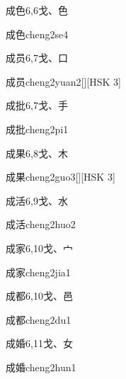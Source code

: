 \begin{entry}{成色}{6,6}{⼽、⾊}
  \begin{phonetics}{成色}{cheng2se4}
  \end{phonetics}
\end{entry}

\begin{entry}{成员}{6,7}{⼽、⼝}
  \begin{phonetics}{成员}{cheng2yuan2}[][HSK 3]
  \end{phonetics}
\end{entry}

\begin{entry}{成批}{6,7}{⼽、⼿}
  \begin{phonetics}{成批}{cheng2pi1}
  \end{phonetics}
\end{entry}

\begin{entry}{成果}{6,8}{⼽、⽊}
  \begin{phonetics}{成果}{cheng2guo3}[][HSK 3]
  \end{phonetics}
\end{entry}

\begin{entry}{成活}{6,9}{⼽、⽔}
  \begin{phonetics}{成活}{cheng2huo2}
  \end{phonetics}
\end{entry}

\begin{entry}{成家}{6,10}{⼽、⼧}
  \begin{phonetics}{成家}{cheng2jia1}
  \end{phonetics}
\end{entry}

\begin{entry}{成都}{6,10}{⼽、⾢}
  \begin{phonetics}{成都}{cheng2du1}
  \end{phonetics}
\end{entry}

\begin{entry}{成婚}{6,11}{⼽、⼥}
  \begin{phonetics}{成婚}{cheng2hun1}
  \end{phonetics}
\end{entry}

